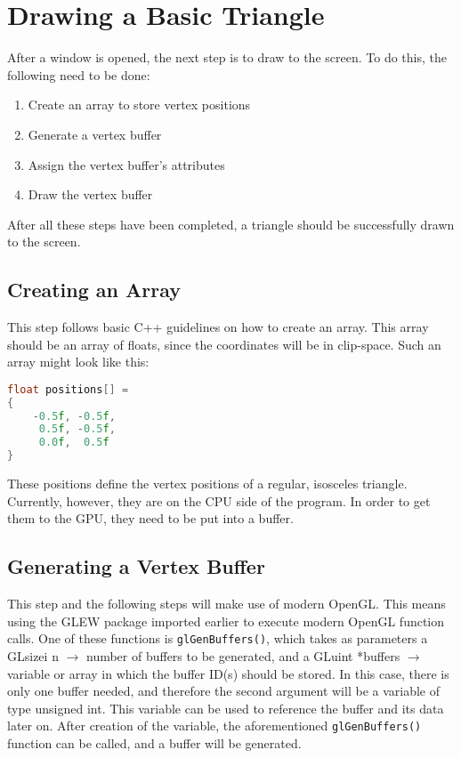 \documentclass{article}
\newcommand{\ilcode}[1]{{\footnotesize\texttt{#1}}}
\begin{document}
\break

\section{Drawing a Basic Triangle}

After a window is opened, the next step is to draw to the screen. To do this, the following need to be done:
\begin{enumerate}
    \item {Create an array to store vertex positions}
    \item {Generate a vertex buffer}
    \item {Assign the vertex buffer's attributes}
    \item {Draw the vertex buffer}
\end{enumerate}

After all these steps have been completed, a triangle should be successfully drawn to the screen.

\subsection{Creating an Array}

This step follows basic C++ guidelines on how to create an array. This array should be an array of floats, since the coordinates will be in clip-space. Such an array might look like this:

\begin{lstlisting}[language=C++]
float positions[] = 
{
    -0.5f, -0.5f,
     0.5f, -0.5f,
     0.0f,  0.5f
}
\end{lstlisting}

These positions define the vertex positions of a regular, isosceles triangle. Currently, however, they are on the CPU side of the program. In order to get them to the GPU, they need to be put into a buffer.

\subsection{Generating a Vertex Buffer}

This step and the following steps will make use of modern OpenGL. This means using the GLEW package imported earlier to execute modern OpenGL function calls. One of these functions is \ilcode{glGenBuffers()}, which takes as parameters a GLsizei n $\rightarrow$ number of buffers to be generated, and a GLuint *buffers $\rightarrow$ variable or array in which the buffer ID(s) should be stored. In this case, there is only one buffer needed, and therefore the second argument will be a variable of type unsigned int. This variable can be used to reference the buffer and its data later on. After creation of the variable, the aforementioned \ilcode{glGenBuffers()} function can be called, and a buffer will be generated.
\end{document}
